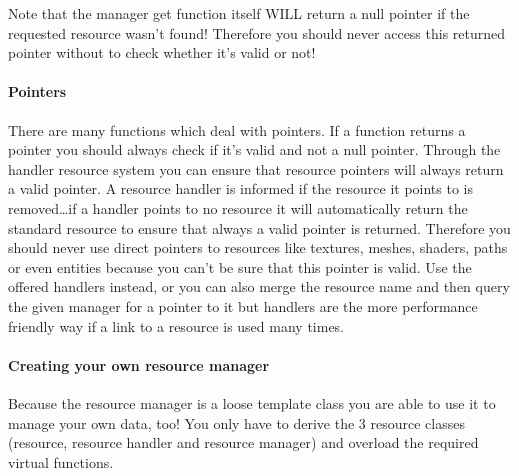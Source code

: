 Note that the manager get function itself WILL return a null pointer if the requested resource wasn't found! Therefore you should never access this returned pointer without to check whether it's valid or not!


\paragraph{Pointers}
There are many functions which deal with pointers. If a function returns a pointer you should always check if it's valid and not a null pointer. Through the handler resource system you can ensure that resource pointers will always return a valid pointer. A resource handler is informed if the resource it points to is removed\ldots if a handler points to no resource it will automatically return the standard resource to ensure that always a valid pointer is returned. Therefore you should never use direct pointers to resources like textures, meshes, shaders, paths or even entities because you can't be sure that this pointer is valid. Use the offered handlers instead, or you can also merge the resource name and then query the given manager for a pointer to it but handlers are the more performance friendly way if a link to a resource is used many times.


\paragraph{Creating your own resource manager}
Because the resource manager is a loose template class you are able to use it to manage your own data, too! You only have to derive the 3 resource classes (resource, resource handler and resource manager) and overload the required virtual functions.
